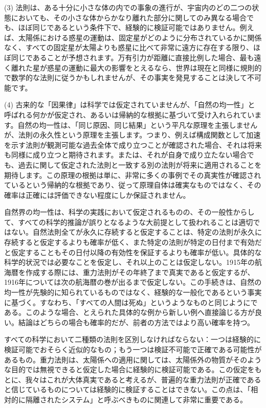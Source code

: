 \documentclass[a4paper,11pt,openany]{ltjsbook}
\begin{document}
(3) 法則は、ある十分に小さな体の内での事象の進行が、宇宙内のどの二つの状態においても、その小さな体からかなり離れた部分に関してのみ異なる場合でも、ほぼ同じであるという条件下で、経験的に検証可能ではありません。例えば、太陽係における惑星の運動は、固定星がどのように分布されているかに関係なく、すべての固定星が太陽よりも惑星に比べて非常に遠方に存在する限り、ほぼ同じであることが予想されます。万有引力が距離に直接比例した場合、最も遠く離れた星が惑星の運動に最大の影響をとえるなら、世界は現在と同様に規則的で数学的な法則に従うかもしれませんが、その事実を発見することは決して不可能です。

(4) 古来的な「因果律」は科学では仮定されていませんが、「自然の均一性」と呼ばれる何かが仮定され、あるいは帰納的な根拠に基づいて受け入れられています。自然の均一性は、「同じ原因、同じ結果」という平凡な原理を主張しませんが、法則の永久性という原理を主張します。つまり、例えば構成関数として加速を示す法則が観測可能な過去全体で成り立つことが確認された場合、それは将来も同様に成り立つと期待されます。または、それが自身で成り立たない場合でも、過去に関して仮定された法則と一致する別の法則が将来に適用されることを期待します。この原理の根拠は単に、非常に多くの事例でその真実性が確認されているという帰納的な根拠であり、従って原理自体は確実なものではなく、その確率は正確には評価できない程度にしか保証されません。

自然界の均一性は、科学の実践において仮定されるものの、その一般性からして、すべての科学的推論が誤りとなるような大前提として扱われることは適切ではない。自然法則全てが永久に存続すると仮定することは、特定の法則が永久に存続すると仮定するよりも確率が低く、また特定の法則が特定の日付まで有効だと仮定することもその日付以降の有効性を保証するよりも確率が低い。具体的な科学的状況では必要なことを仮定し、それ以上のことは仮定しない。1915年の航海暦を作成する際には、重力法則がその年終了まで真実であると仮定するが、1916年については次の航海暦の巻が出るまで仮定しない。この手続きは、自然の均一性が先験的に知られているものではなく、経験的な一般化であるという事実に基づく。すなわち、「すべての人間は死ぬ」というようなものと同じようにである。このような場合、とえられた具体的な例から新しい例へ直接論じる方が良い。結論はどちらの場合も確率的だが、前者の方法ではより高い確率を持つ。

すべての科学において二種類の法則を区別しなければならない：一つは経験的に検証可能でおそらく近似的なもの；もう一つは検証不可能で正確である可能性があるもの。重力法則は、太陽係への適用に関しては、太陽係外の物質がそのような目的では無視できると仮定した場合に経験的に検証可能である。この仮定をもとに、我々はこれが大体真実であると考えるが、普遍的な重力法則が正確であると信じているものについては経験的に検証することはできない。この点は、「相対的に隔離されたシステム」と呼ぶべきものに関連して非常に重要である。
\end{document}

